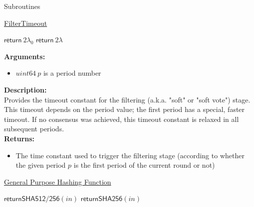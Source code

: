 \documentclass[10pt,a4paper]{article}
\begin{document}
\begin{section}{Subroutines}\label{sect:soubroutines}


\begin{algorithm}[H]
    \caption{\underline{FilterTimeout}}
    \label{algo:filter-timeout}
    \begin{algorithmic}[1]
            \State $\mathsf{return} \ 2\lambda_0$
        \Else 
            \State $\mathsf{return} \ 2\lambda$
        \EndIf
    \EndFunction
    \end{algorithmic}
\end{algorithm}

\noindent \textbf{Arguments:}
\begin{itemize}
    \item $uint64 \ p$ is a period number
  \end{itemize}

\noindent \textbf{Description:}\\
Provides the timeout constant for the filtering (a.k.a. "soft" or "soft vote") stage.
This timeout depends on the period value; the first period has a special, faster timeout.
If no consensus was achieved, this timeout constant is relaxed in all subsequent periods. \\

\noindent \textbf{Returns:}
\begin{itemize}
    \item The time constant used to trigger the filtering stage (according to whether the given
    period $p$ is the first period of the current round or not)
  \end{itemize}


\begin{algorithm}[H]
    \caption{\underline{General Purpose Hashing Function}}
    \begin{algorithmic}[1]
            \State $\mathsf{return SHA512/256}(in)$
        \Else
            \State $\mathsf{return SHA256}(in)$
        \EndIf
    \EndFunction
    \end{algorithmic}
\end{algorithm}


\end{section}
\end{document}
